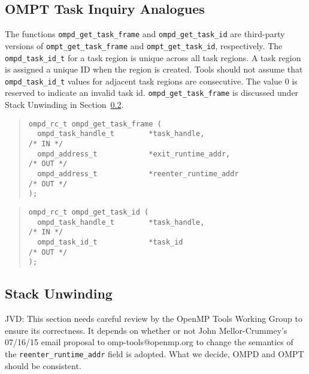%
\subsection{OMPT Task Inquiry Analogues}
%
The functions \verb|ompd_get_task_frame| and \verb|ompd_get_task_id|
are third-party versions of \verb|ompt_get_task_frame| and
\verb|ompt_get_task_id|, respectively.
%
The \verb|ompd_task_id_t| for a task region is unique across all task
regions.
%
A task region is assigned a unique ID when the region is created.
Tools should not assume that \verb|ompd_task_id_t| values for adjacent
task regions are consecutive.
%
The value 0 is reserved to indicate an invalid task id.
%
\texttt{ompd\_get\_task\_frame} is discussed under Stack Unwinding in
Section~\ref{stack-unwinding:sec}.
%
\begin{quote}
\begin{lstlisting}
ompd_rc_t ompd_get_task_frame (
  ompd_task_handle_t        *task_handle,                           /* IN */
  ompd_address_t            *exit_runtime_addr,                    /* OUT */
  ompd_address_t            *reenter_runtime_addr                  /* OUT */
);
\end{lstlisting}
\end{quote}
%
\begin{quote}
\begin{lstlisting}
ompd_rc_t ompd_get_task_id (
  ompd_task_handle_t        *task_handle,                           /* IN */
  ompd_task_id_t            *task_id                               /* OUT */
);
\end{lstlisting}
\end{quote}

%
\subsection{Stack Unwinding}
\label{stack-unwinding:sec}
%
\begin{notes}
JVD: This section needs careful review by the OpenMP Tools Working
Group to ensure its correctness.  It depends on whether or not John
Mellor-Crummey's 07/16/15 email proposal to omp-tools@openmp.org to
change the semantics of the \verb|reenter_runtime_addr| field is
adopted.  What we decide, OMPD and OMPT should be consistent.
\end{notes}


